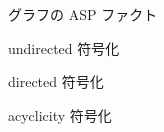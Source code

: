 \documentclass[dvipdfmx,10pt]{beamer}
\begin{document}
\begin{frame}[noframenumbering]{グラフの ASP ファクト}

\begin{figure}[t]
\begin{center}

\end{center}
\end{figure}



\end{frame}

\begin{frame}[noframenumbering]{\textsf{undirected} 符号化}



\end{frame}

\begin{frame}[noframenumbering]{\textsf{directed} 符号化}



\end{frame}

\begin{frame}[noframenumbering]{\textsf{acyclicity} 符号化}



\end{frame}
\end{document}
